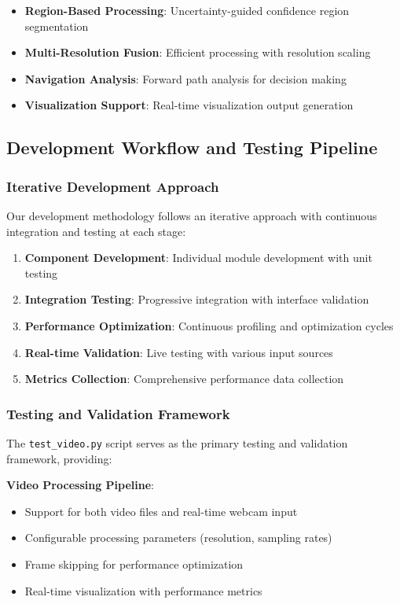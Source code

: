 \documentclass[12pt,oneside]{book}
\begin{document}
\begin{itemize}
\item \textbf{Region-Based Processing}: Uncertainty-guided confidence region segmentation
\item \textbf{Multi-Resolution Fusion}: Efficient processing with resolution scaling
\item \textbf{Navigation Analysis}: Forward path analysis for decision making
\item \textbf{Visualization Support}: Real-time visualization output generation
\end{itemize}

\subsection{Development Workflow and Testing Pipeline}

\subsubsection{Iterative Development Approach}

Our development methodology follows an iterative approach with continuous integration and testing at each stage:

\begin{enumerate}
\item \textbf{Component Development}: Individual module development with unit testing
\item \textbf{Integration Testing}: Progressive integration with interface validation
\item \textbf{Performance Optimization}: Continuous profiling and optimization cycles
\item \textbf{Real-time Validation}: Live testing with various input sources
\item \textbf{Metrics Collection}: Comprehensive performance data collection
\end{enumerate}

\subsubsection{Testing and Validation Framework}

The \texttt{test\_video.py} script serves as the primary testing and validation framework, providing:

\textbf{Video Processing Pipeline}:
\begin{itemize}
\item Support for both video files and real-time webcam input
\item Configurable processing parameters (resolution, sampling rates)
\item Frame skipping for performance optimization
\item Real-time visualization with performance metrics
\end{itemize}
\end{document}
